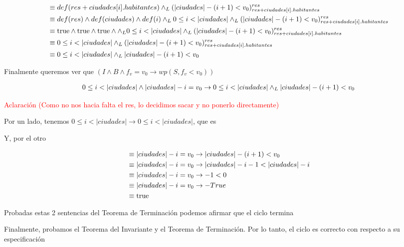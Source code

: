 \documentclass[10pt,a4paper]{article}
\begin{document}
\begin {enumerate}
    \begin{align*}
        &\equiv def (res + ciudades[i].habitantes) \land _L (|ciudades| - (i + 1) < v_{0})_{res + ciudades[i].habitantes}^{res} \\
        &\equiv def(res) \land def(ciudades) \land def(i) \land _L 0 \leq i < |ciudades| \land _L (|ciudades| - (i + 1) < v_{0})_{res + ciudades[i].habitantes}^{res}\\
        &\equiv \mathrm{true} \land \mathrm{true} \land \mathrm{true} \land \land _L 0 \leq i < |ciudades| \land _L (|ciudades| - (i + 1) < v_{0})_{res + ciudades[i].habitantes}^{res}\\
        &\equiv 0 \leq i < |ciudades| \land _L (|ciudades| - (i + 1) < v_{0})_{res + ciudades[i].habitantes}^{res}\\
        &\equiv 0 \leq i < |ciudades| \land _L |ciudades| - (i + 1) < v_{0}
    \end{align*}

    Finalmente queremos ver que $(I \land B \land f_{v} = v_{0} \to wp(S, f_{v} < v_{0}))$


    \begin{align*}
        0 \leq i < |ciudades| \land |ciudades| - i = v_{0} \to 0 \leq i < |ciudades| \land _L |ciudades| - (i + 1) < v_{0}
    \end{align*}

    \textcolor{red}{Aclaración (Como no nos hacia falta el res, lo decidimos sacar y no ponerlo directamente)}

    Por un lado, tenemos $0 \leq i < |ciudades| \to 0 \leq i < |ciudades|$, que es \True

    Y, por el otro 

    \begin{align*}
        &\equiv |ciudades| - i = v_{0} \to |ciudades| - (i + 1) < v_{0} \\
        &\equiv |ciudades| - i = v_{0} \to |ciudades| - i - 1 < |ciudades| - i \\
        &\equiv |ciudades| - i = v_{0} \to - 1 < 0 \\
        &\equiv |ciudades| - i = v_{0} \to - True \\
        &\equiv \mathrm{true}
    \end{align*}

    Probadas estas 2 sentencias del Teorema de  Terminación podemos afirmar que el ciclo termina

    Finalmente, probamos el Teorema del Invariante y el Teorema de Terminación. Por lo tanto, el ciclo es correcto con respecto a su especificación


\end{enumerate}
\end{document}
